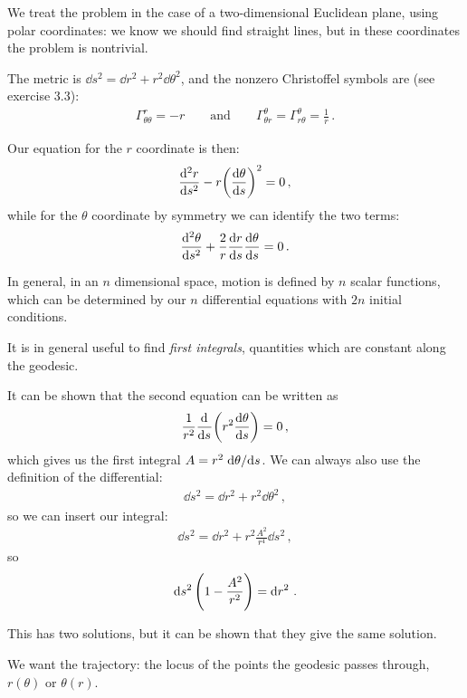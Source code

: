 \documentclass[main.tex]{subfiles}
\begin{document}
We treat the problem in the case of a two-dimensional Euclidean plane, using polar coordinates: we know we should find straight lines, but in these coordinates the problem is nontrivial.

The metric is \(\dd{s^2} = \dd{r^2} + r^2 \dd{\theta^2}\), and the nonzero Christoffel symbols are (see exercise 3.3): 
%
\begin{align}
  \Gamma^{r}_{\theta \theta } = -r 
  \qquad \text{and} \qquad 
  \Gamma^{\theta }_{\theta r } = 
  \Gamma^{\theta }_{r \theta } = \frac{1}{r} 
\,.
\end{align}

Our equation for the \(r\) coordinate is then: 
%
\begin{align}
  \dv[2]{r}{s} - r \qty(\dv{\theta }{s})^2 = 0
\,,
\end{align}
%
while for the \(\theta \) coordinate by symmetry we can identify the two terms: 
%
\begin{align}
  \dv[2]{\theta }{s} + \frac{2}{r} \dv{r}{s} \dv{\theta }{s} =0
\,.
\end{align}

In general, in an \(n\) dimensional space, motion is defined by \(n\) scalar functions, which can be determined by our \(n\) differential equations with \(2n\) initial conditions.

It is in general useful to find \emph{first integrals}, quantities which are constant along the geodesic.

It can be shown that the second equation can be written as
%
\begin{align}
  \frac{1}{r^2} \dv[]{}{s} \qty(r^2 \dv{\theta }{s}) =0
\,,
\end{align}
%
which gives us the first integral \(A = r^2 \dv*{\theta }{s}\).
We can always also use the definition of the differential: 
%
\begin{align}
    \dd{s^2} = \dd{r^2} + r^2 \dd{\theta^2 } 
    \,,
\end{align}
%
so we can insert our integral:
%
\begin{align}
    \dd{s^2} = \dd{r^2} + r^2 \frac{A^2}{r^{4}} \dd{s^2}
\,,
\end{align}
%
so 
%
\begin{align}
  \dd{s^2} \qty(1- \frac{A^2}{r^2}) = \dd{r^2}
\,.
\end{align}

This has two solutions, but it can be shown that they give the same solution.

We want the trajectory: the locus of the points the geodesic passes through, \(r(\theta )\) or \(\theta (r)\).
\end{document}
